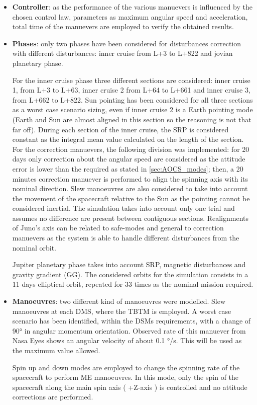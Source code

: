 \begin{itemize}
    \item \textbf{Controller}: as the performance of the various manuevers is influenced by the chosen control law, parameters as maximum angular speed and acceleration, total time of the manuevers are employed to verify the obtained results. 
    
    \item \textbf{Phases}: only two phases have been considered for disturbances correction with different disturbances: inner cruise from L+3 to L+822 and jovian planetary phase. 
    
    For the inner cruise phase three different sections are considered: inner cruise 1, from L+3 to L+63, inner cruise 2 from L+64 to L+661 and inner cruise 3, from L+662 to L+822. Sun pointing has been considered for all three sections as a worst case scenario sizing, even if inner cruise 2 is a Earth pointing mode (Earth and Sun are almost aligned in this section so the reasoning is not that far off). During each section of the inner cruise, the SRP is considered constant as the integral mean value calculated on the length of the section.
     For the correction manuevers, the following division was implemented: for 20 days only correction about the angular speed are considered as the attitude error is lower than the required as stated in \autoref{sec:AOCS_modes}; then, a 20 minutes correction manuever is performed to align the spinning axis with its nominal direction. Slew manoeuvres are also considered to take into account the movement of the spacecraft relative to the Sun as the pointing cannot be considered inertial. The simulation takes into account only one trial and assumes no difference are present between contiguous sections. Realignments of Juno's axis can be related to safe-modes and general to correction manuevers as the system is able to handle different disturbances from the nominal orbit. 
    
    Jupiter planetary phase takes into account SRP, magnetic disturbances and gravity gradient (GG). The considered orbits for the simulation consists in a 11-days elliptical orbit, repeated for 33 times as the nominal mission required. 

    \item \textbf{Manoeuvres}: two different kind of manoeuvres were modelled. Slew manoeuvres at each DMS, where the TBTM is employed. A worst case scenario has been identified, within the DSMs requirements, with a change of 90° in angular momentum orientation. Observed rate of this manuever from Nasa Eyes\cite{nasa_eyes} shows an angular velocity of about 0.1 °/s. This will be used as the maximum value allowed. 
    
    Spin up and down modes are employed to change the spinning rate of the spacecraft to perform ME manoeuvres. In this mode, only the spin of the spacecraft along the main spin axis ( +Z-axis ) is controlled and no attitude corrections are performed.      

\end{itemize}


